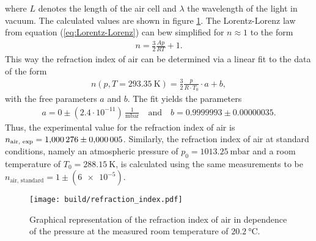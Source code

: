 where $L$ denotes the length of the air cell and $\lambda$ the wavelength of the light in vacuum.
The calculated values are shown in figure \ref{fig:refraction_index}.
The Lorentz-Lorenz law from equation (\ref{eq:Lorentz-Lorenz}) can bew simplified for $n\approx1$ to the form
\begin{align}
    n = \frac 32 \frac{Ap}{RT}+1.
\end{align}
This way the refraction index of air can be determined via a linear fit to the data of the form
\begin{align}
    n(p, T=\SI{293.35}{\kelvin}) = \frac 32 \frac{p}{R\cdot T_0}\cdot a + b,
\end{align}
with the free parameters $a$ and $b$.
The fit yields the parameters
\begin{align*}
    a = 0\pm (2.4\cdot 10^{-11})\, \frac1{\text{mbar}} \quad \text{and} \quad b = 0.9999993 \pm 0.00000035.
\end{align*}
Thus, the experimental value for the refraction index of air is $n_{\text{air, exp}}=\num{1.000276\pm0.000005}$. \newline
Similarly, the refraction index of air at standard conditions, namely an atmospheric pressure of $p_0=\SI{1013.25}{\milli\bar}$ and a room temperature of $T_0=\SI{288.15}{\kelvin}$, is calculated using the same measurements to be $n_{\text{air, standard}}=1\pm(\num{6e-5})$.
\begin{figure}[H]
    \centering
    \texttt{[image: build/refraction\_index.pdf]}
    \caption{Graphical representation of the refraction index of air in dependence of the pressure at the measured room temperature of $\SI{20.2}{\celsius}$.}
    \label{fig:refraction_index}
\end{figure}